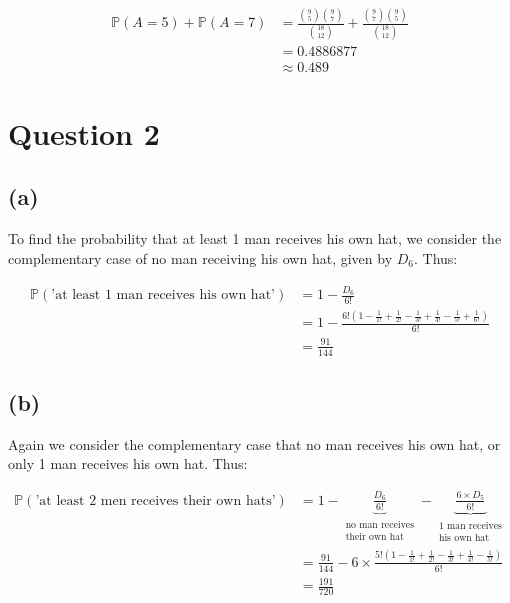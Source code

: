 \documentclass[12pt]{article}
\begin{document}
\begin{align*}
    \mathbb{P}(A = 5) + \mathbb{P}(A = 7) &= \frac{\binom{9}{5}\binom{9}{7}}{\binom{18}{12}} + \frac{\binom{9}{7}\binom{9}{5}}{\binom{18}{12}} \\ 
    &= 0.4886877 \\ 
    &\boxed{\approx 0.489}
\end{align*}

\newpage

\section*{Question 2}

\subsection*{(a)}

To find the probability that at least 1 man receives his own hat, we consider the complementary case of no man receiving his own hat, given by $D_6$. Thus:

\begin{align*}
    \mathbb{P}(\text{'at least 1 man receives his own hat'}) &= 1 - \frac{D_{6}}{6!} \\ 
    &= 1 - \frac{6! (1-\frac{1}{1!}+\frac{1}{2!}- \frac{1}{3!}+\frac{1}{4!} - \frac{1}{5!}+\frac{1}{6!})}{6!} \\
    &= \boxed{\frac{91}{144}}
\end{align*}

\subsection*{(b)}

Again we consider the complementary case that no man receives his own hat, or only 1 man receives his own hat. Thus:

\begin{align*}
    \mathbb{P}(\text{'at least 2 men receives their own hats'}) &= 1 - \underbrace{\frac{D_{6}}{6!}}_{\substack{\text{no man receives} \\ \text{their own hat}}} - \underbrace{\frac{6 \times D_{5}}{6!}}_{\substack{\text{1 man receives} \\ \text{his own hat}}} \\ 
    &= \frac{91}{144} - 6 \times \frac{5!(1-\frac{1}{1!}+\frac{1}{2!}-\frac{1}{3!}+\frac{1}{4!}-\frac{1}{5!})}{6!}\\
    &= \boxed{\frac{191}{720}}
\end{align*}
\end{document}
